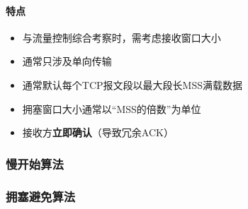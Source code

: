 \paragraph{特点}
\begin{itemize}
    \item 与流量控制综合考察时，需考虑接收窗口大小
    \item 通常只涉及单向传输
    \item 通常默认每个TCP报文段以最大段长MSS满载数据
    \item 拥塞窗口大小通常以“MSS的倍数”为单位
    \item 接收方\textbf{立即确认}（导致冗余ACK）
\end{itemize}


\subsubsection{慢开始算法}



\subsubsection{拥塞避免算法}






















